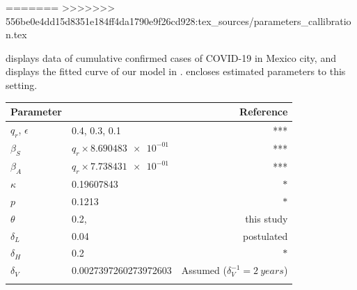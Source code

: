 =======
>>>>>>> 556be0e4dd15d8351e184ff4da1790e9f26cd928:tex_sources/parameters_callibration.tex

 displays data of cumulative confirmed cases
of COVID-19 in Mexico city, and  displays the fitted curve
of our model in .
 encloses estimated parameters to this
setting.

  \begin{table}
    \centering
    \begin{tabular}{@{}llr@{}}
    \toprule
        Parameter
        &   \centering{Median}
        &   Reference
        \\
        \midrule
          $q_r$, $\epsilon$
            &
              \num{.4}, \num{.3}, \num{.1}
            &
              ***
        \\
            $\beta_S$
            & $q_r \times \num{8.690483e-01} $
            & ***
        \\
            $\beta_A$
            & $q_r \times \num{7.738431e-01}$
            & ***

        \\
            $\kappa$
            & \num{0.19607843}
            & $*$
        \\
            $p$
            & \num{0.1213}
            & $*$
        \\
          $\theta$
          & \num{0.2},
          & this study
        \\
          $\delta_L$
          & \num{0.04}
          & postulated
        \\
            $\delta_H$
            &\num{0.2}
            & $*$
        \\
          $\delta_V$
          &\num{ 0.0027397260273972603}
          & Assumed ($\delta_V ^{-1} = \SI{2}{years}$)
        \\
        &&


\end{tabular}
\end{table}
